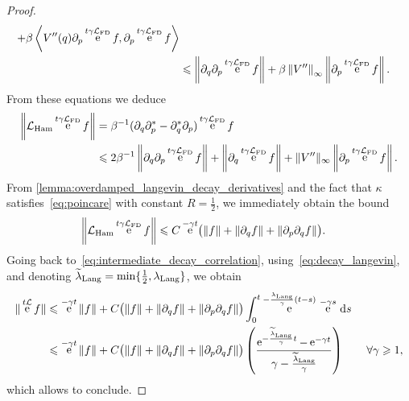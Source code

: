 \documentclass[11pt,a4paper]{article}
\DeclareMathOperator{\e}{e}
\renewcommand{\d}{\mathrm d}
\theoremstyle{plain}
\numberwithin{equation}{section}
\renewcommand{\leq}{\leqslant}
\renewcommand{\geq}{\geqslant}
\begin{document}
\begin{proof}
\begin{align*}
        + \beta \ip{V''(q) \partial_p \e^{t \gamma \mathcal L_{\rm FD}} f}{\partial_p \e^{t \gamma \mathcal L_{\rm FD}} f} \\
        &\leq \norm{\partial_q \partial_p \e^{t \gamma \mathcal L_{\rm FD}} f}
        + \beta \norm{V''}[\infty] \norm{\partial_p \e^{t \gamma \mathcal L_{\rm FD}} f}.
    \end{align*}
    From these equations we deduce
    \begin{align*}
        \norm{\mathcal L_{\rm Ham} \e^{t \gamma \mathcal L_{\rm FD}} f}
        &= \beta^{-1} (\partial_q \partial_p^* - \partial_q^* \partial_p) \e^{t \gamma \mathcal L_{\rm FD}} f \\
        &\leq 2 \beta^{-1} \norm{\partial_q \partial_p \e^{t \gamma \mathcal L_{\rm FD}} f}
        + \norm{\partial_q \e^{t \gamma \mathcal L_{\rm FD}} f}
        + \norm*{V''}[\infty] \norm{\partial_p \e^{t \gamma \mathcal L_{\rm FD}} f}.
    \end{align*}
    From \cref{lemma:overdamped_langevin_decay_derivatives} and the fact that $\kappa$ satisfies~\eqref{eq:poincare} with constant $R = \frac{1}{2}$,
    we immediately obtain the bound
    \begin{align*}
        \norm{\mathcal L_{\rm Ham} \e^{t \gamma \mathcal L_{\rm FD}} f}
        &\leq C \e^{-\gamma t} \bigl( \norm{f} + \norm{\partial_q f} + \norm{\partial_p \partial_q f}\bigr).
    \end{align*}
    Going back to~\eqref{eq:intermediate_decay_correlation}, using~\eqref{eq:decay_langevin},
    and denoting $\widetilde \lambda_{\rm Lang} = \min \{\frac{1}{2}, \lambda_{\rm Lang} \}$,
    we obtain
    \begin{align*}
        \norm*{ \e^{t \mathcal L} f}
        &\leq  \e^{-\gamma t} \norm{f}
        + C  \bigl( \norm{f} + \norm{\partial_q f} + \norm{\partial_p \partial_q f}\bigr) \int_{0}^{t} \e^{-\frac{\lambda_{\rm Lang}}{\gamma}(t-s)}  \, \e^{-\gamma s} \, \d s \\
        &\leq  \e^{-\gamma t} \norm{f}
        + C \bigl( \norm{f} + \norm{\partial_q f} + \norm{\partial_p \partial_q f}\bigr)
        \left( \frac{\e^{- \frac{\widetilde \lambda_{\rm Lang}}{\gamma}t} - \e^{- \gamma t}}{\gamma - \frac{\widetilde \lambda_{\rm Lang}}{\gamma}} \right) \qquad \forall \gamma \geq 1,
    \end{align*}
    which allows to conclude.
\end{proof}
\end{document}
